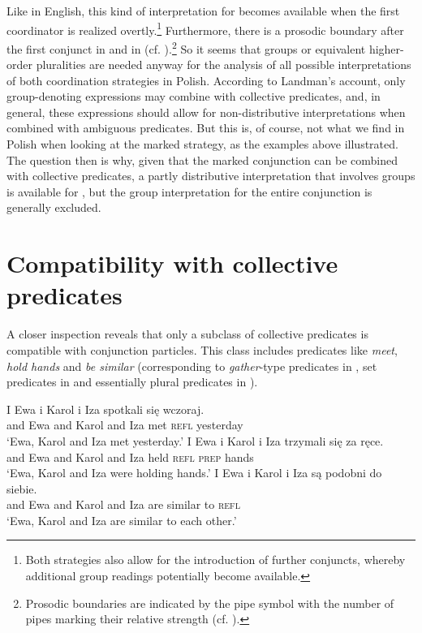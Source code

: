 \documentclass[output=paper]{langscibook}
\begin{document}
\noindent Like in English, this kind of interpretation for  becomes available when the first coordinator is realized overtly.\footnote{Both strategies also allow for the introduction of further conjuncts, whereby additional group readings potentially become available.} Furthermore, there is a prosodic boundary after the first conjunct in  and in  (cf. \citealt{Winter:2002, Wagner:2010}).\footnote{Prosodic boundaries are indicated by the pipe symbol with the number of pipes marking their relative strength (cf. \citealt{Wagner:2010}).} So it seems that groups or equivalent higher-order pluralities are needed anyway for the analysis of all possible interpretations of both coordination strategies in Polish. According to Landman's account, only group-denoting expressions may combine with collective predicates, and, in general, these expressions should allow for non-distributive interpretations when combined with ambiguous predicates. But this is, of course, not what we find in Polish when looking at the marked strategy, as the examples above illustrated. The question then is why, given that the marked conjunction can be combined with collective predicates, a partly distributive interpretation that involves groups is available for , but the group interpretation for the entire conjunction is generally excluded.  



\section{Compatibility with collective predicates}\label{ros:sec:3}

A closer inspection reveals that only a subclass of collective predicates is compatible with conjunction particles. This class includes predicates like \textit{meet}, \textit{hold hands} and \textit{be similar} (corresponding to \textit{gather}-type predicates in \citealt{Champollion:2010}, set predicates in \citealt{Winter:2002} and essentially plural predicates in \citealt{Hackl:2002}). 

\ea\label{ros:meet} \gll  I Ewa i Karol i Iza spotkali się wczoraj. \\
and Ewa and Karol and Iza  met \textsc{refl} yesterday \\
\glt `Ewa, Karol and Iza met yesterday.' 
\ex\label{ros:hand} \gll I Ewa i Karol i Iza trzymali się za ręce. \\
and Ewa and Karol and Iza held \textsc{refl} \textsc{prep} hands \\
\glt `Ewa, Karol and Iza were holding hands.' 
\ex\label{ros:similar} \gll  I Ewa i Karol i Iza są podobni do siebie. \\
and Ewa and Karol and Iza are similar to \textsc{refl} \\
\glt `Ewa, Karol and Iza are similar to each other.' 
\z
\end{document}
